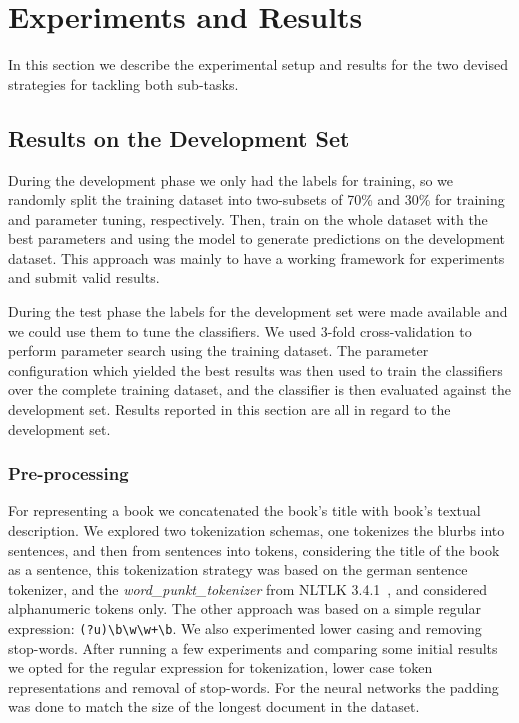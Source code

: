 \documentclass[11pt,a4paper]{article}
\begin{document}
\section{Experiments and Results}\label{section_experiments}

In this section we describe the experimental setup and results for the two
devised strategies for tackling both sub-tasks.

\subsection{Results on the Development Set}\label{experiments}

During the development phase we only had the labels for training, so we
randomly split the training dataset into two-subsets of 70\% and 30\% for
training and parameter tuning, respectively. Then, train on the whole
dataset with the best parameters and using the model to generate predictions on
the development dataset. This approach was mainly to have a working framework
for experiments and submit valid results.

During the test phase the labels for the development set were made available
and we could use them to tune the classifiers. We used 3-fold cross-validation
to perform parameter search using the training dataset. The parameter
configuration which yielded the best results was then used to train
the classifiers over the complete training dataset, and the classifier is then
evaluated against the development set. Results reported in this section
are all in regard to the development set.

\subsubsection{Pre-processing}

For representing a book we concatenated the book's title with book's textual
description. We explored two tokenization schemas, one tokenizes the blurbs into
sentences, and then from sentences into tokens, considering the title of the
book as a sentence, this tokenization strategy was based on the german sentence
tokenizer, and the \textit{word\_punkt\_tokenizer} from NLTLK 3.4.1~\cite{Bird:2009:NLP:1717171},
and considered alphanumeric tokens only. The other approach was based on a
simple regular expression: \verb|(?u)\b\w\w+\b|. We also experimented lower casing
and removing stop-words. After running a few experiments and comparing some
initial results we opted for the regular expression for tokenization, lower case
token representations and removal of stop-words. For the neural networks the
padding was done to match the size of the longest document in the dataset.
\end{document}
